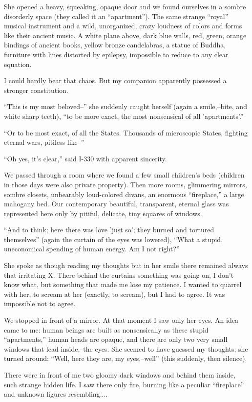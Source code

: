\documentclass[11pt,openany]{book}
\begin{document}
She opened a heavy, squeaking, opaque door and we found ourselves in a sombre disorderly space (they called it an ``apartment''). The same strange ``royal'' musical instrument and a wild, unorganized, crazy loudness of colors and forms like their ancient music. A white plane above, dark blue walls, red, green, orange bindings of ancient books, yellow bronze candelabras, a statue of Buddha, furniture with lines distorted by epilepsy, impossible to reduce to any clear equation.

I could hardly bear that chaos. But my companion apparently possessed a stronger constitution.

``This is my most beloved--'' she suddenly caught herself (again a smile,--bite, and white sharp teeth), ``to be more exact, the most nonsensical of all 'apartments'.''

``Or to be most exact, of all the States. Thousands of microscopic States, fighting eternal wars, pitiless like--''

``Oh yes, it's clear,'' said I-330 with apparent sincerity.

We passed through a room where we found a few small children's beds (children in those days were also private property). Then more rooms, glimmering mirrors, sombre closets, unbearably loud-colored divans, an enormous ``fireplace,'' a large mahogany bed. Our contemporary beautiful, transparent, eternal glass was represented here only by pitiful, delicate, tiny squares of windows.

``And to think; here there was love 'just so'; they burned and tortured themselves'' (again the curtain of the eyes was lowered), ``What a stupid, uneconomical spending of human energy. Am I not right?''

She spoke as though reading my thoughts but in her smile there remained always that irritating X. There behind the curtains something was going on, I don't know what, but something that made me lose my patience. I wanted to quarrel with her, to scream at her (exactly, to scream), but I had to agree. It was impossible not to agree.

We stopped in front of a mirror. At that moment I saw only her eyes. An idea came to me: human beings are built as nonsensically as these stupid ``apartments,'' human heads are opaque, and there are only two very small windows that lead inside,--the eyes. She seemed to have guessed my thoughts; she turned around: ``Well, here they are, my eyes,--well'' (this suddenly, then silence).

There were in front of me two gloomy dark windows and behind them inside, such strange hidden life. I saw there only fire, burning like a peculiar ``fireplace'' and unknown figures resembling....
\end{document}
